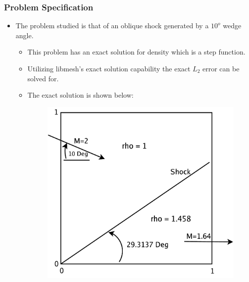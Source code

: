 \frame
{
  \frametitle{Problem Specification}
  \begin{itemize}[<+->]
    \item The problem studied is that of an oblique shock generated by a $10^o$ wedge angle. 
      \begin{itemize}[<+->]
      \item This problem has an exact solution for density which is a step function.
      \item Utilizing libmesh's exact solution capability the exact
$L_2$ error can be solved for.
      \item The exact solution is shown below:
        \begin{figure}
          \begin{center}
            \includegraphics[viewport=20 10 660 600,clip=true,width=.4\textwidth]{figures/shock.pdf}
          \end{center}
        \end{figure}
    \end{itemize}
  \end{itemize}
}

